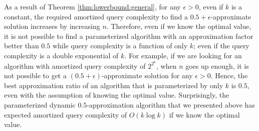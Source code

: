 \documentclass[11pt]{article}
\newcommand{\mO}{O}
\begin{document}
As a result of Theorem \ref{thm:lowerbound:general}, for any $\epsilon>0$, even if $k$ is a constant, the required amortized query complexity to find a $0.5+\epsilon$-approximate solution increases by increasing $n$.
Therefore, even if we know the optimal value, it is not possible to find a parameterized algorithm with an approximation factor better than $0.5$ while query complexity is a function of only $k$; even if the query complexity is a double exponential of $k$. For example, if we are looking for an algorithm with amortized query complexity of $2^{2^k}$, when $n$ goes up enough, it is not possible to get a $(0.5+\epsilon)$-approximate solution for any $\epsilon>0$. 
Hence, the best approximation ratio of an algorithm that is parameterized by only $k$ is $0.5$, even with the assumption of knowing the optimal value. 
Surprisingly, the parameterized dynamic $0.5$-approximation algorithm that we presented above has expected amortized query complexity of $\mO(k \log k)$ if we know the optimal value. 

%
 
\end{document}
